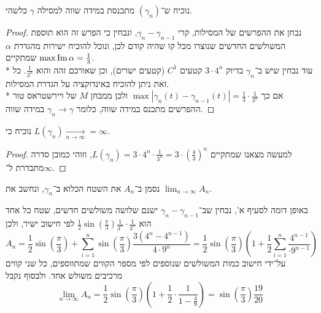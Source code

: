 \subquestion{}
נוכיח ש־$(\gamma_n)$ מתכנסת במידה שווה למסילה $\gamma$ כלשהי.
\begin{proof}
	נבחן את ההפרשים של המסילות, קרי $\gamma_n - \gamma_{n - 1}$, ונבחין כי הפרש זה הוא תוספת המשולשים החדשים שנוצרו מכל קו שהיה קודם לכן,
	ונוכל להוכיח ישירות מהגדרת $\alpha$ שמתקיים $\max \operatorname{Im} \alpha = \frac{1}{3}$. \\*
	עוד נבחין שיש ב־$\gamma_n$ בדיוק $3 \cdot 4^n$ קטעים $C^1$ (קטעים ישרים), וכן שאורכם זהה והוא $\frac{1}{3^n}$. כל זאת ניתן להוכיח באינדוקציה על הגדרת המסילות. \\*
	אם כך $\max |\gamma_n(t) - \gamma_{n - 1}(t)| = \frac{1}{3} \cdot \frac{1}{3^n}$ ולכן ממבחן $M$ של ויירשטראס טור ההפרשים מתכנס במידה שווה, כלומר $\gamma_n \to \gamma$ במידה שווה.
\end{proof}

\subquestion{}
נוכיח כי $L(\gamma_n) \xrightarrow[n \to \infty]{} = \infty$.
\begin{proof}
	למעשה מצאנו שמתקיים $L(\gamma_n) = 3 \cdot 4^n \cdot \frac{1}{3^n} = 3 \cdot {\left(\frac{4}{3}\right)}^n$, וזוהי כמובן סדרה מתבדרת ל־$\infty$.
\end{proof}

\subquestion{}
נסמן ב־$A_n$ את השטח הכלוא ב־$\gamma_n$, ונחשב את $\lim_{n \to \infty} A_n$.
\begin{solution}
	באופן דומה לסעיף א', נבחין שב־$\gamma_n - \gamma_{n - 1}$ ישנם שלושה משולשים חדשים, שטח כל אחד הוא $\frac{1}{2} \sin(\frac{\pi}{3}) \frac{1}{3^n} \cdot \frac{1}{3^n}$ לפי חישוב ישיר, ולכן
	\[
		A_n = \frac{1}{2} \sin(\frac{\pi}{3}) + \sum_{i = 1}^{n} \sin(\frac{\pi}{3}) \frac{3 (4^n - 4^{n - 1})}{4 \cdot 9^n}
		= \frac{1}{2} \sin(\frac{\pi}{3}) (1 + \frac{1}{2} \sum_{i = 1}^{n} \frac{4^{n - 1} }{\cdot 9^{n - 1}})
	\]
	על־ידי חישוב כמות המשולשים שנוספים לפי מספר הקווים שמתווספים, כל שני קווים מרכיבים משולש אחד.
	ולבסוף נקבל
	\[
		\lim_{n \to \infty} A_n
		= \frac{1}{2} \sin(\frac{\pi}{3}) (1 + \frac{1}{2} \cdot \frac{1}{1 - \frac{4}{9}})
		= \sin(\frac{\pi}{3}) \frac{19}{20}
	\]
\end{solution}


